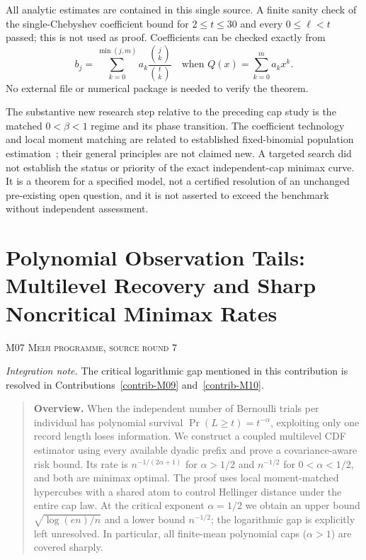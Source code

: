\documentclass[11pt,a4paper]{article}
\theoremstyle{definition}\newtheorem{definition}[theorem]{Definition}
\theoremstyle{remark}\newtheorem{remark}[theorem]{Remark}
\numberwithin{equation}{section}
\begin{document}
All analytic estimates are contained in this single source. A finite sanity check of the single-Chebyshev coefficient bound for $2\le t\le30$ and every $0\le\ell<t$ passed; this is not used as proof. Coefficients can be checked exactly from
\[
 b_j=\sum_{k=0}^{\min(j,m)}a_k\frac{\binom{j}{k}}{\binom{t}{k}}
 \quad\text{when }Q(x)=\sum_{k=0}^ma_kx^k.
\]
No external file or numerical package is needed to verify the theorem.

The substantive new research step relative to the preceding cap study is the matched $0<\beta<1$ regime and its phase transition. The coefficient technology and local moment matching are related to established fixed-binomial population estimation~\cite{ref014,ref015}; their general principles are not claimed new. A targeted search did not establish the status or priority of the exact independent-cap minimax curve. It is a theorem for a specified model, not a certified resolution of an unchanged pre-existing open question, and it is not asserted to exceed the benchmark without independent assessment.





\clearpage
\section[M07 --- Polynomial Observation Tails: Multilevel Recovery and Sharp Noncritical Minimax Rates]{Polynomial Observation Tails: Multilevel Recovery and Sharp Noncritical Minimax Rates}\label{contrib-M07}
\noindent\textsc{M07 \quad Meiji programme, source round 7}\par\medskip
\noindent\textit{Integration note.} The critical logarithmic gap mentioned in this contribution is resolved in Contributions~\ref{contrib-M09} and~\ref{contrib-M10}.\par\medskip


\begin{quote}\small\textbf{Overview.} When the independent number of Bernoulli trials per individual has polynomial survival $\Pr(L\ge t)=t^{-\alpha}$, exploiting only one record length loses information. We construct a coupled multilevel CDF estimator using every available dyadic prefix and prove a covariance-aware risk bound. Its rate is $n^{-1/(2\alpha+1)}$ for $\alpha>1/2$ and $n^{-1/2}$ for $0<\alpha<1/2$, and both are minimax optimal. The proof uses local moment-matched hypercubes with a shared atom to control Hellinger distance under the entire cap law. At the critical exponent $\alpha=1/2$ we obtain an upper bound $\sqrt{\log(en)/n}$ and a lower bound $n^{-1/2}$; the logarithmic gap is explicitly left unresolved. In particular, all finite-mean polynomial caps ($\alpha>1$) are covered sharply.\end{quote}
\end{document}
